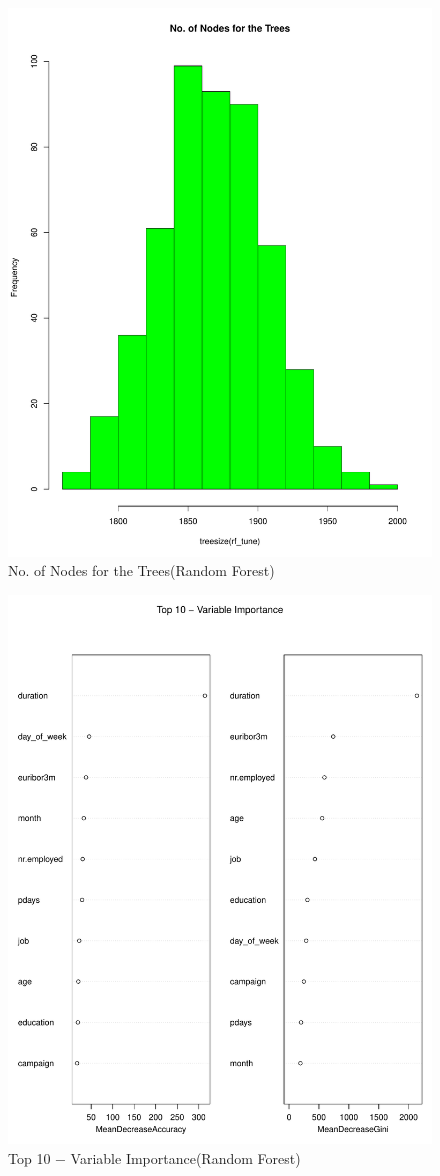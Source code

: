 \documentclass[12pt, a4paper, bibliography=totoc, english]{scrartcl}
\begin{document}
\begin{figure}
	\centering
	\includegraphics[width=0.7\linewidth]{RF4}
	\caption{No. of Nodes for the Trees(Random Forest)}
	\label{fig:rf4}
\end{figure}

\begin{figure}
	\centering
	\includegraphics[width=0.7\linewidth]{RF5}
	\caption{Top 10 − Variable Importance(Random Forest)}
	\label{fig:rf5}
\end{figure}
\end{document}
